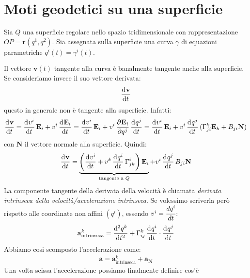 \section{Moti geodetici su una superficie}
Sia $Q$ una superficie regolare nello spazio tridimensionale con rappresentazione $OP=\mathbf{r}(q^1,q^2)$. Sia assegnata sulla superficie una curva $\gamma$ di equazioni parametriche $q^i(t)=\gamma^i(t)$.

Il vettore $\mathbf{v}(t)$ tangente alla curva è banalmente tangente anche alla superficie. Se consideriamo invece il suo vettore derivata:
\begin{align*}
    \dod{\mathbf{v}}{t}
\end{align*}
questo in generale non è tangente alla superficie. Infatti:
\begin{align*}
   \dod{\mathbf{v}}{t} =\dod{v^i}{t}\mathbf{E}_i+v^i\dod{\mathbf{E}_i}{t}=\dod{v^i}{t}\mathbf{E}_i+v^i\dpd{\mathbf{E}_i}{{q^j}}\dod{q^j}{t}=\dod{v^i}{t}\mathbf{E}_i+v^i\dod{q^j}{t}(\Gamma_{ji}^k\mathbf{E}_k+B_{ji}\mathbf{N})
\end{align*}
con $\mathbf{N}$ il vettore normale alla superficie. Quindi:
\begin{align*}
    \dod{\mathbf{v}}{t}=\underbrace{\left(\dod{v^i}{t}+v^k\dod{q^i}{t}\Gamma^i_{jk}\right)\mathbf{E}_i}_{\text{tangente a }Q}+v^i\dod{q^j}{t}B_{ji}\mathbf{N}
\end{align*}
La componente tangente della derivata della velocità è chiamata \emph{derivata intrinseca della velocità/accelerazione intrinseca}. Se volessimo scriverla però rispetto alle coordinate non affini $(q^i)$, essendo $v^i=\cfrac{dq^i}{dt}$: %
\begin{align*}
    \mathbf{a}^k_{\text{intrinseca}}=\dod[2]{q^k}{t}+\Gamma^k_{ij}\dod{q^i}{t}\cdot \dod{q^j}{t}
\end{align*}
Abbiamo cosi scomposto l'accelerazione come:
\begin{align*}
    \mathbf{a}=\mathbf{a}^k_{\text{intrinseca}}+\mathbf{a}_{\mathbf{N}}
\end{align*}
Una volta scissa l'accelerazione possiamo finalmente definire cos'è 

